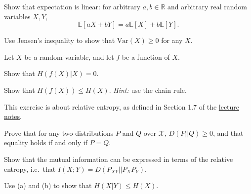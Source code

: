 \documentclass[a4paper,10pt,landscape,twocolumn]{scrartcl}
\begin{document}
\begin{exercise}
	\begin{subex}[(1pt)]
	Show that expectation is linear: for arbitrary $a,b \in \mathbb{R}$ and arbitrary real random variables $X,Y$,
	\[
	\mathbb{E}[aX + bY] = a\mathbb{E}[X] + b \mathbb{E}[Y].
	\]
	\end{subex}
	\begin{subex}[(1pt)]
	Use Jensen's inequality to show that $\mbox{Var}(X) \geq 0$ for any $X$.
	\end{subex}
\end{exercise}

\begin{exercise}
Let $X$ be a random variable, and let $f$ be a function of $X$.
	\begin{subex}[(1pt)]
	Show that $H(f(X) | X) = 0$.
	\end{subex}
	\begin{subex}[(2pt)]
	Show that $H(f(X)) \leq H(X)$. \emph{Hint:} use the chain rule.
	\end{subex}
\end{exercise}


\begin{exercise}
This exercise is about relative entropy, as defined in Section 1.7 of the \href{https://github.com/cschaffner/InformationTheory/raw/master/Script/InfTheory3.pdf}{lecture notes}. 
	\begin{subex}[(5pt)]
	Prove that for any two distributions $P$ and $Q$ over $\mathcal{X}$, $D(P||Q) \geq 0$, and that equality holds if and only if $P = Q$.
	\end{subex}
	\begin{subex}[(3pt)]
	Show that the mutual information can be expressed in terms of the relative entropy, i.e.\ that $I(X;Y) = D(P_{XY}||P_XP_Y)$.
	\end{subex}
	\begin{subex}[(1pt)]
	Use (a) and (b) to show that $H(X|Y) \leq H(X)$.
	\end{subex}
\end{exercise}
\end{document}
